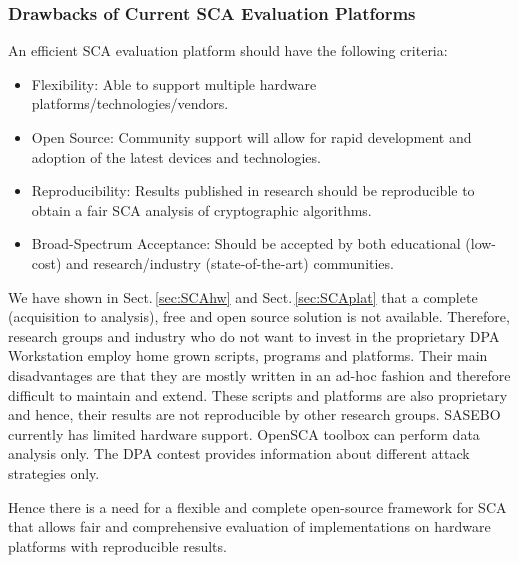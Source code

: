 \documentclass{llncs}
\numberwithin{algorithm}{chapter}
\begin{document}
\subsubsection{Drawbacks of Current SCA Evaluation Platforms}
An efficient SCA evaluation platform should have the following criteria:
\begin{itemize}
 \item Flexibility: Able to support multiple hardware platforms/technologies/vendors.
 \item Open Source: Community support will allow for rapid development and adoption 
       of the latest devices and technologies.
 \item Reproducibility: Results published in research should be reproducible to obtain 
       a fair SCA analysis of cryptographic algorithms.  
 \item Broad-Spectrum Acceptance: Should be accepted by both educational (low-cost) and 
       research/industry (state-of-the-art) communities.
\end{itemize}
We have shown in Sect.\,\ref{sec:SCAhw} and Sect.\,\ref{sec:SCAplat} that a complete 
(acquisition to analysis), free and open source solution is not available. 
Therefore, research groups and industry who do not want to invest in the proprietary DPA Workstation\texttrademark
employ home grown scripts, programs and platforms. Their main disadvantages are that they are mostly written
in an ad-hoc fashion and therefore difficult to maintain and extend. These scripts and platforms are also
proprietary and hence, their results are not reproducible by other research groups.
SASEBO currently has limited hardware support. OpenSCA toolbox can perform data analysis
only. The DPA contest provides information about different attack strategies only. 
 
Hence there is a need for a flexible and complete open-source framework for SCA that allows 
fair and comprehensive evaluation of implementations on hardware platforms with 
reproducible results.


\end{document}

